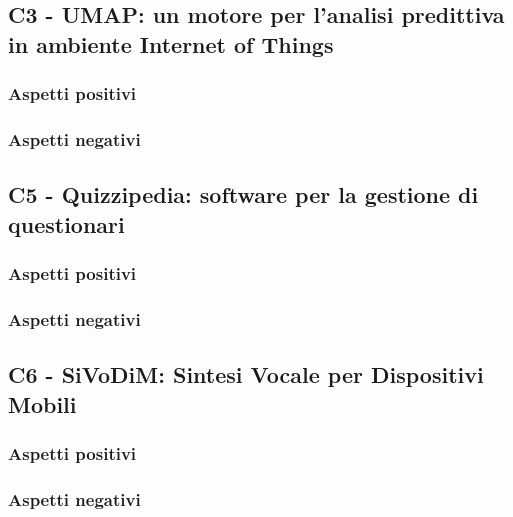 \subsection{C3 - UMAP: un motore per l'analisi predittiva in ambiente Internet of Things}
\subsubsection{Aspetti positivi}
\subsubsection{Aspetti negativi}

\subsection{C5 - Quizzipedia: software per la gestione di questionari}
\subsubsection{Aspetti positivi}
\subsubsection{Aspetti negativi}

\subsection{C6 - SiVoDiM: Sintesi Vocale per Dispositivi Mobili}
\subsubsection{Aspetti positivi}
\subsubsection{Aspetti negativi}


